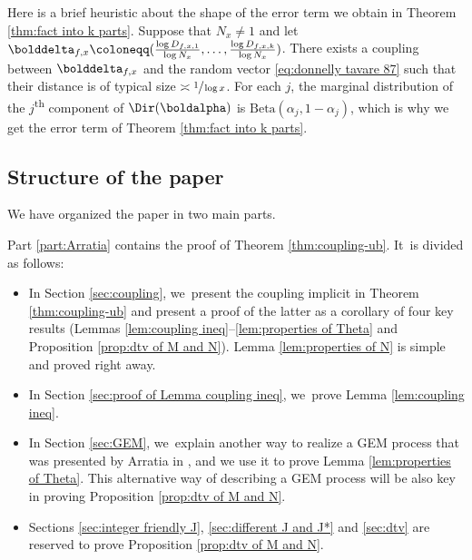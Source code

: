 \begin{rems}
Here is a brief heuristic about the shape of the error term we obtain in Theorem \ref{thm:fact into k parts}. Suppose that $N_x \ne 1$ and let $\bolddelta_{f, x} \coloneqq (\frac{\log D_{f, x, 1}}{\log N_x}, \ldots, \frac{\log D_{f, x, k}}{\log N_x})$. There exists a coupling between $\bolddelta_{f, x}$ and the random vector \eqref{eq:donnelly tavare 87} such that their distance is of typical size $\asymp \sfrac{1}{\log x}$. For each $j$, the marginal distribution of the $j$\textsuperscript{th} component of $\Dir(\boldalpha)$ is $\mathrm{Beta}(\alpha_j, 1-\alpha_j)$, which is why we get the error term of Theorem \ref{thm:fact into k parts}.
\end{rems}

\subsection{Structure of the paper}

We have organized the paper in two main parts.

Part \ref{part:Arratia} contains the proof of Theorem \ref{thm:coupling-ub}. It~is divided as follows:
\begin{itemize}
\item In Section \ref{sec:coupling}, we~present the coupling implicit in Theorem \ref{thm:coupling-ub} and present a proof of the latter as a corollary of four key results (Lemmas \ref{lem:coupling ineq}--\ref{lem:properties of Theta} and Proposition \ref{prop:dtv of M and N}). Lemma \ref{lem:properties of N} is simple and proved right away.

\item In Section \ref{sec:proof of Lemma coupling ineq}, we~prove Lemma \ref{lem:coupling ineq}.

\item In Section \ref{sec:GEM}, we~explain another way to realize a GEM process that was presented by Arratia in \cite{Arratia02}, and we use it to prove Lemma \ref{lem:properties of Theta}. This alternative way of describing a GEM process will be also key in proving Proposition \ref{prop:dtv of M and N}.

\item Sections \ref{sec:integer friendly J}, \ref{sec:different J and J*} and \ref{sec:dtv} are reserved to prove Proposition \ref{prop:dtv of M and N}.
\end{itemize}

